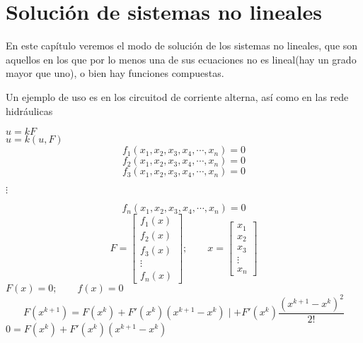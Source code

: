 \chapter{Soluci\'on de sistemas no lineales}

En este cap\'itulo veremos el modo de soluci\'on de los sistemas no lineales, que son aquellos en los que por lo menos una de sus ecuaciones no es lineal(hay un grado mayor que uno), o bien hay funciones compuestas.\\
\begin{center}
Un ejemplo de uso es en los circuitod de corriente alterna, as\'i como en las rede hidr\'aulicas
\end{center}
$u=kF$\\
$u=k(u,F)$\\
\begin{displaymath}
f_1(x_1,x_2,x_3,x_4,\cdots, x_n)=0
\end{displaymath}
\begin{displaymath}
f_2(x_1,x_2,x_3,x_4,\cdots, x_n)=0
\end{displaymath}
\begin{displaymath}
f_3(x_1,x_2,x_3,x_4,\cdots, x_n)=0
\end{displaymath}
\begin{center}
$\vdots$
\end{center}
\begin{displaymath}
f_n(x_1,x_2,x_3,x_4,\cdots, x_n)=0
\end{displaymath}
\begin{displaymath}
F=\begin{bmatrix}
f_1(x)\\
f_2(x)\\
f_3(x)\\
\vdots \\
f_n(x)
\end{bmatrix}; \qquad x=\begin{bmatrix}
x_1\\
x_2\\
x_3\\
\vdots \\
x_n
\end{bmatrix}
\end{displaymath}
$F(x)=0; \qquad f(x)=0$\\
\begin{displaymath}
F(x^{k+1})=F(x^k)+F'(x^k)(x^{k+1}-x^k)\mid +F'(x^k)\frac{(x^{k+1}-x^k)^2}{2!}
\end{displaymath}
$0=F(x^k)+F'(x^k)(x^{k+1}-x^k)$\\
